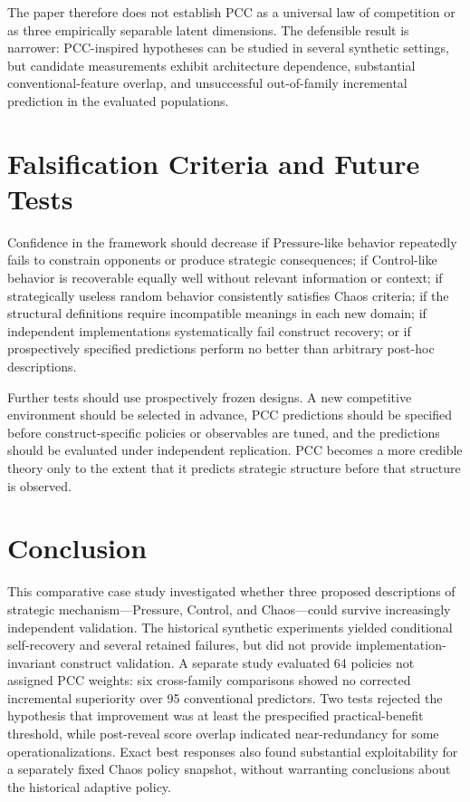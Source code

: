 \documentclass[journal]{IEEEtran}
\begin{document}
The paper therefore does not establish PCC as a universal law of competition or as three empirically separable latent dimensions. The defensible result is narrower: PCC-inspired hypotheses can be studied in several synthetic settings, but candidate measurements exhibit architecture dependence, substantial conventional-feature overlap, and unsuccessful out-of-family incremental prediction in the evaluated populations.

\section{Falsification Criteria and Future Tests}

Confidence in the framework should decrease if Pressure-like behavior repeatedly fails to constrain opponents or produce strategic consequences; if Control-like behavior is recoverable equally well without relevant information or context; if strategically useless random behavior consistently satisfies Chaos criteria; if the structural definitions require incompatible meanings in each new domain; if independent implementations systematically fail construct recovery; or if prospectively specified predictions perform no better than arbitrary post-hoc descriptions.

Further tests should use prospectively frozen designs. A new competitive environment should be selected in advance, PCC predictions should be specified before construct-specific policies or observables are tuned, and the predictions should be evaluated under independent replication. PCC becomes a more credible theory only to the extent that it predicts strategic structure before that structure is observed.

\section{Conclusion}

This comparative case study investigated whether three proposed descriptions of strategic mechanism---Pressure, Control, and Chaos---could survive increasingly independent validation. The historical synthetic experiments yielded conditional self-recovery and several retained failures, but did not provide implementation-invariant construct validation. A separate study evaluated 64 policies not assigned PCC weights: six cross-family comparisons showed no corrected incremental superiority over 95 conventional predictors. Two tests rejected the hypothesis that improvement was at least the prespecified practical-benefit threshold, while post-reveal score overlap indicated near-redundancy for some operationalizations. Exact best responses also found substantial exploitability for a separately fixed Chaos policy snapshot, without warranting conclusions about the historical adaptive policy.
\end{document}
